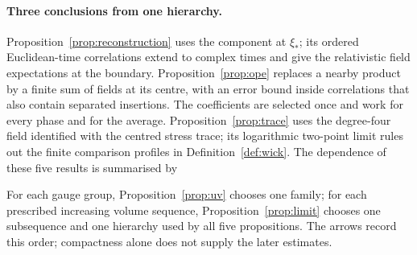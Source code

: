 \paragraph{Three conclusions from one hierarchy.}
Proposition~\ref{prop:reconstruction} uses the component at $\xi_*$; its ordered Euclidean-time correlations extend to complex times and give the relativistic field expectations at the boundary.
Proposition~\ref{prop:ope} replaces a nearby product by a finite sum of fields at its centre, with an error bound inside correlations that also contain separated insertions.
The coefficients are selected once and work for every phase and for the average.
Proposition~\ref{prop:trace} uses the degree-four field identified with the centred stress trace; its logarithmic two-point limit rules out the finite comparison profiles in Definition~\ref{def:wick}.
The dependence of these five results is summarised by
\begin{center}
\end{center}
For each gauge group, Proposition~\ref{prop:uv} chooses one family; for each prescribed increasing volume sequence, Proposition~\ref{prop:limit} chooses one subsequence and one hierarchy used by all five propositions.
The arrows record this order; compactness alone does not supply the later estimates.
